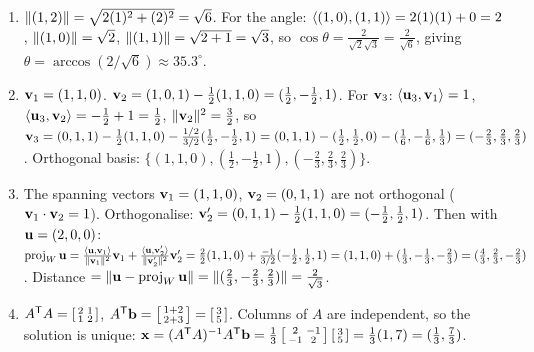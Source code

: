 \begin{enumerate}[label=\textbf{5.\arabic*},leftmargin=2.6em,itemsep=8pt]

\item $\lVert (1,2) \rVert=\sqrt{2(1)^2+(2)^2}=\sqrt6$. For the angle: $\langle (1,0), (1,1) \rangle=2(1)(1)+0=2$, $\lVert (1,0) \rVert=\sqrt2$, $\lVert (1,1) \rVert=\sqrt{2+1}=\sqrt3$, so $\cos\theta=\tfrac{2}{\sqrt2\sqrt3}=\tfrac{2}{\sqrt6}$, giving $\theta=\arccos(2/\sqrt6)\approx35.3^\circ$.

\item $\mathbf{v}_1=(1,1,0)$. $\mathbf{v}_2=(1,0,1)-\tfrac{1}{2}(1,1,0)=(\tfrac12,-\tfrac12,1)$. For $\mathbf{v}_3$: $\langle \mathbf{u}_3, \mathbf{v}_1 \rangle=1$, $\langle \mathbf{u}_3, \mathbf{v}_2 \rangle=-\tfrac12+1=\tfrac12$, $\lVert \mathbf{v}_2 \rVert^2=\tfrac32$, so $\mathbf{v}_3=(0,1,1)-\tfrac12(1,1,0)-\tfrac{1/2}{3/2}(\tfrac12,-\tfrac12,1)=(0,1,1)-(\tfrac12,\tfrac12,0)-(\tfrac16,-\tfrac16,\tfrac13)=(-\tfrac23,\tfrac23,\tfrac23)$. Orthogonal basis: $\{(1,1,0),(\tfrac12,-\tfrac12,1),(-\tfrac23,\tfrac23,\tfrac23)\}$.

\item The spanning vectors $\mathbf{v}_1=(1,1,0)$, $\mathbf{v}_2=(0,1,1)$ are not orthogonal ($\mathbf{v}_1\cdot\mathbf{v}_2=1$). Orthogonalise: $\mathbf{v}_2'=(0,1,1)-\tfrac12(1,1,0)=(-\tfrac12,\tfrac12,1)$. Then with $\mathbf{u}=(2,0,0)$: $\operatorname{proj}_W\mathbf{u}=\tfrac{\langle \mathbf{u}, \mathbf{v}_1 \rangle}{\lVert \mathbf{v}_1 \rVert^2}\mathbf{v}_1+\tfrac{\langle \mathbf{u}, \mathbf{v}_2' \rangle}{\lVert \mathbf{v}_2' \rVert^2}\mathbf{v}_2'=\tfrac{2}{2}(1,1,0)+\tfrac{-1}{3/2}(-\tfrac12,\tfrac12,1)=(1,1,0)+(\tfrac13,-\tfrac13,-\tfrac23)=(\tfrac43,\tfrac23,-\tfrac23)$. Distance $=\lVert \mathbf{u}-\operatorname{proj}_W\mathbf{u} \rVert=\lVert (\tfrac23,-\tfrac23,\tfrac23) \rVert=\tfrac{2}{\sqrt3}$.

\item $A^{\mathsf{T}} A=\left[\begin{smallmatrix}2&1\\1&2\end{smallmatrix}\right]$, $A^{\mathsf{T}}\mathbf{b}=\left[\begin{smallmatrix}1+2\\2+3\end{smallmatrix}\right]=\left[\begin{smallmatrix}3\\5\end{smallmatrix}\right]$. Columns of $A$ are independent, so the solution is unique: $\mathbf{x}=(A^{\mathsf{T}} A)^{-1} A^{\mathsf{T}}\mathbf{b}=\tfrac13\left[\begin{smallmatrix}2&-1\\-1&2\end{smallmatrix}\right]\left[\begin{smallmatrix}3\\5\end{smallmatrix}\right]=\tfrac13(1,7)=(\tfrac13,\tfrac73)$.


\end{enumerate}
